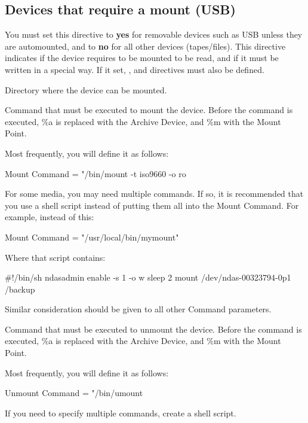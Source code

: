 \subsection{Devices that require a mount (USB)}

\begin{description}
\item {}
You must set this directive to {\bf yes} for removable devices such as
USB unless they are automounted, and to {\bf no} for all other devices
(tapes/files).  This directive indicates if the device requires to be
mounted to be read, and if it must be written in a special way.  If it
set, , 
 and 
directives must also be defined.

\item {}
Directory where the device can be mounted.

\item {}
Command that must be executed to mount the device. Before the command is
executed, \%a is replaced with the Archive Device, and \%m with the Mount
Point.

Most frequently, you will define it as follows:

\begin{bconfig}{}
Mount Command = "/bin/mount -t iso9660 -o ro %
\end{bconfig}

For some media, you may need multiple commands.  If so, it is recommended
that you use a shell script instead of putting them all into the Mount
Command.  For example, instead of this:

\begin{bconfig}{}
Mount Command = "/usr/local/bin/mymount"
\end{bconfig}

Where that script contains:

\begin{commands}{}
#!/bin/sh
ndasadmin enable -s 1 -o w
sleep 2
mount /dev/ndas-00323794-0p1 /backup
\end{commands}

Similar consideration should be given to all other Command parameters.

\item {}
Command that must be executed to unmount the device. Before the command  is
executed, \%a is replaced with the Archive Device, and \%m with the  Mount
Point.

Most frequently, you will define it as follows:

\begin{bconfig}{}
Unmount Command = "/bin/umount %
\end{bconfig}

  If you need to specify multiple commands, create a shell script.

\end{description}

